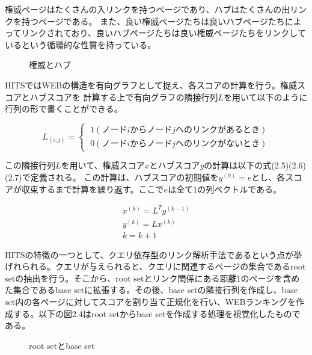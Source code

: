 \documentclass[a4paper,11pt]{jreport}
\begin{document}
権威ページはたくさんの入リンクを持つページであり、ハブはたくさんの出リンクを持つページである。
また、良い権威ページたちは良いハブページたちによってリンクされており、良いハブページたちは良い権威ページたちをリンクしているという循環的な性質を持っている。

\begin{figure}[htbp]
\begin{center}
\end{center}
\caption{権威とハブ}
\label{figure:sample}
\end{figure}

HITSではWEBの構造を有向グラフとして捉え、各スコアの計算を行う。権威スコアとハブスコアを
計算する上で有向グラフの隣接行列$L$を用いて以下のように行列の形で書くことができる。

\begin{equation}
L_(i,j) =
\begin{cases}
\; 1　(ノードiからノードjへのリンクがあるとき) \\
\; 0　(ノードiからノードjへのリンクがないとき)
\end{cases}
\end{equation}

この隣接行列$L$を用いて、権威スコア$x$とハブスコア$y$の計算は以下の式(2.5)(2.6)(2.7)で定義される。
この計算は、ハブスコアの初期値を$y^(0) = e$とし、各スコアが収束するまで計算を繰り返す。ここで$e$は全て1の列ベクトルである。

\begin{eqnarray}
x^{(k)} = L^Ty^{(k-1)} \\
y^{(k)} = Lx^{(k)} \\
k = k + 1
\end{eqnarray}

HITSの特徴の一つとして、クエリ依存型のリンク解析手法であるという点が挙げれられる。クエリが与えられると、クエリに関連するページの集合であるroot setの抽出を行う。そこから、root setとリンク関係にある距離1のページを含めた集合であるbase setに拡張する。その後、base setの隣接行列を作成し、base set内の各ページに対してスコアを割り当て正規化を行い、WEBランキングを作成する。以下の図2.4はroot setからbase setを作成する処理を視覚化したものである。

\begin{figure}[htbp]
\begin{center}
\end{center}
\caption{root setとbase set}
\label{figure:sample}
\end{figure}
\end{document}
